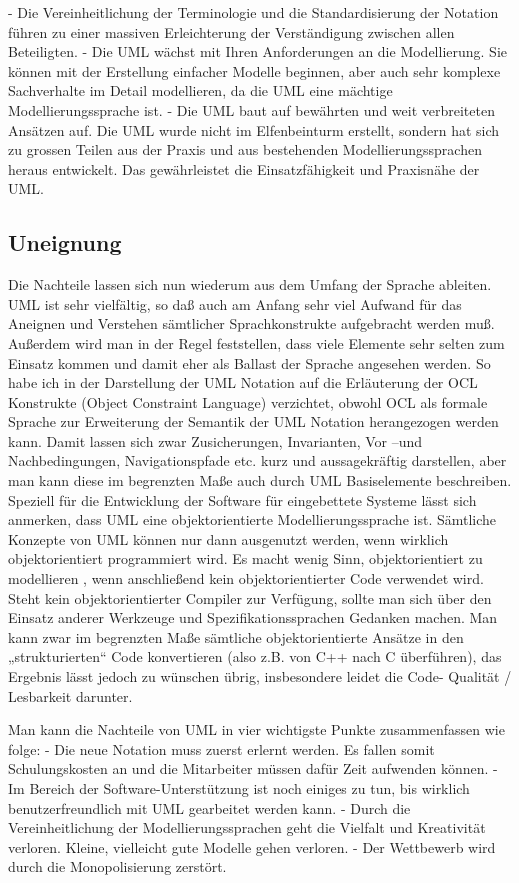 - Die Vereinheitlichung der Terminologie und die Standardisierung der Notation
führen zu einer massiven Erleichterung der Verständigung zwischen allen
Beteiligten.
- Die UML wächst mit Ihren Anforderungen an die Modellierung. Sie können mit der
Erstellung einfacher Modelle beginnen, aber auch sehr komplexe Sachverhalte im
Detail modellieren, da die UML eine mächtige Modellierungssprache ist.
- Die UML baut auf bewährten und weit verbreiteten Ansätzen auf. Die UML wurde
nicht im Elfenbeinturm erstellt, sondern hat sich zu grossen Teilen aus der Praxis
und aus bestehenden Modellierungssprachen heraus entwickelt. Das gewährleistet
die Einsatzfähigkeit und Praxisnähe der UML.

\subsection{Uneignung}
Die Nachteile lassen sich nun wiederum aus dem Umfang der Sprache ableiten. UML ist sehr vielfältig, so daß auch am Anfang  sehr viel Aufwand für das Aneignen und Verstehen sämtlicher Sprachkonstrukte aufgebracht werden muß. Außerdem wird man in der  Regel feststellen, dass viele Elemente sehr selten zum Einsatz kommen und damit eher als Ballast der Sprache angesehen werden. So habe ich in der Darstellung der UML Notation auf die Erläuterung der OCL Konstrukte (Object Constraint Language) verzichtet, obwohl OCL als formale Sprache zur Erweiterung der Semantik der UML Notation herangezogen werden kann. Damit lassen sich zwar Zusicherungen, Invarianten, Vor –und Nachbedingungen, Navigationspfade etc. kurz und aussagekräftig darstellen, aber man kann diese im begrenzten Maße auch durch UML Basiselemente beschreiben.
Speziell für die Entwicklung der Software für eingebettete Systeme lässt sich anmerken, dass UML eine objektorientierte Modellierungssprache ist. Sämtliche Konzepte von UML können nur dann ausgenutzt werden, wenn wirklich objektorientiert programmiert wird. Es macht wenig Sinn, objektorientiert zu modellieren , wenn  anschließend kein objektorientierter Code verwendet wird. Steht kein objektorientierter Compiler zur Verfügung, sollte man sich über den Einsatz anderer Werkzeuge und Spezifikationssprachen Gedanken machen. Man kann zwar im begrenzten Maße sämtliche objektorientierte Ansätze in den „strukturierten“ Code konvertieren (also z.B. von C++ nach C überführen), das Ergebnis lässt jedoch zu wünschen übrig, insbesondere leidet die Code- Qualität / Lesbarkeit darunter.

Man kann die Nachteile von UML in vier wichtigste Punkte zusammenfassen wie folge:
- Die neue Notation muss zuerst erlernt werden. Es fallen somit Schulungskosten an
und die Mitarbeiter müssen dafür Zeit aufwenden können.
- Im Bereich der Software-Unterstützung ist noch einiges zu tun, bis wirklich
benutzerfreundlich mit UML gearbeitet werden kann.
- Durch die Vereinheitlichung der Modellierungssprachen geht die Vielfalt und
Kreativität verloren. Kleine, vielleicht gute Modelle gehen verloren.
- Der Wettbewerb wird durch die Monopolisierung zerstört.
